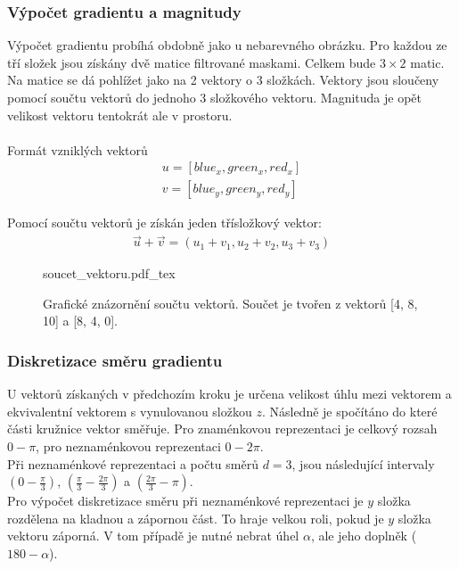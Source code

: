 \documentclass[czech,BP]{thesiskiv}
\begin{document}
\subsubsection{Výpočet gradientu a magnitudy}
Výpočet gradientu probíhá obdobně jako u nebarevného obrázku. Pro každou ze tří složek jsou získány dvě matice filtrované maskami. Celkem bude $3 \times 2$ matic. Na matice se dá pohlížet jako na 2 vektory o 3 složkách. Vektory jsou sloučeny pomocí součtu vektorů do jednoho 3 složkového vektoru. Magnituda je opět velikost vektoru tentokrát ale v prostoru. \\
\\
Formát vzniklých vektorů 
\begin{align}
	\label{barevny_poem_vznikle_vektory}
			 u = [blue_x, green_x, red_x] \\
			 v = [blue_y, green_y, red_y]
\end{align}

Pomocí součtu vektorů je získán jeden třísložkový vektor:
\begin{align}
   \label{soucet_vektrou} \vec{u} + \vec{v} = (u_1 + v_1, u_2 + v_2, u_3 + v_3 )
\end{align} 

\begin{figure}[H]
    \centering
    \def\svgwidth{\columnwidth}
    {soucet_vektoru.pdf_tex} 
    \caption{Grafické znázornění součtu vektorů. Součet je tvořen z vektorů [4, 8, 10] a [8, 4, 0].}
\end{figure}

\subsubsection{Diskretizace směru gradientu}
U vektorů získaných v předchozím kroku je určena velikost úhlu mezi vektorem a ekvivalentní vektorem s vynulovanou složkou $z$. Následně je spočítáno do které části kružnice vektor směřuje. Pro znaménkovou reprezentaci je celkový rozsah $0 - \pi$, pro neznaménkovou reprezentaci $0 - 2\pi$.
\\
Při neznaménkové reprezentaci a počtu směrů $d = 3$, jsou následující intervaly $\left(0 - \frac{\pi}{3}\right)$, $\left(\frac{\pi}{3} - \frac{2\pi}{3}\right)$ a  $\left(\frac{2\pi}{3} - \pi\right)$.
\\
Pro výpočet diskretizace směru při neznaménkové reprezentaci je $y$ složka rozdělena na kladnou a zápornou část. To hraje velkou roli, pokud je $y$ složka vektoru záporná. V tom případě je nutné nebrat úhel $\alpha$, ale jeho doplněk ($ 180 - \alpha$).
\end{document}
